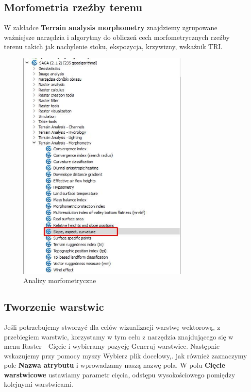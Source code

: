 \documentclass[12pt,a4paper]{book}
\begin{document}
\subsection{Morfometria rzeźby terenu}
W zakładce \textbf{Terrain analysis morphometry }znajdziemy zgrupowane ważniejsze narzędzia i algorytmy do obliczeń cech morfometrycznych rzeźby terenu takich jak nachylenie stoku, ekspozycja, krzywizny, wskaźnik TRI.



\begin{center}
\begin{figure}
\includegraphics[width=8.597cm,height=11.709cm]{004-morfo.jpg}
\caption{Analizy morfometryczne}
\end{figure}
\end{center}
\subsection{Tworzenie warstwic}
Jeśli potrzebujemy stworzyć dla celów wizualizacji warstwę wektorową, z przebiegiem warstwic, korzystamy w tym celu z narzędzia znajdującego się w menu Raster - Cięcie i wybieramy pozycję Generuj warstwice. Następnie wskazujemy przy pomocy myszy Wybierz plik docelowy,. jak również zaznaczymy pole \textbf{Nazwa atrybutu }i wprowadzamy naszą nazwę pola. W polu \textbf{Cięcie warstwicowe }ustawiamy parametr cięcia, odstępu wysokościowego pomiędzy kolejnymi\textbf{ }warstwicami.
\end{document}
